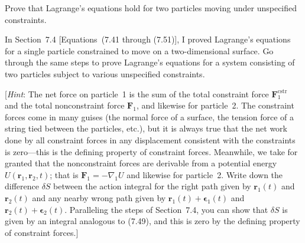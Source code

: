 \documentclass[11pt,letterpaper,boxed]{../hmcpset}
\renewcommand{\vec}[1]{\mathbf{#1}}
\begin{document}
\begin{problem}[ii]
Prove that Lagrange's equations hold for two particles moving under unspecified constraints. 

\begin{problem}[7.13]
In Section~7.4 [Equations~(7.41 through (7.51)], I proved Lagrange's equations for a single particle constrained to move on a two-dimensional surface. 
Go through the same steps to prove Lagrange's equations for a system consisting of two particles subject to various unspecified constraints. 

\bigskip

[\textit{Hint}: The net force on particle~1 is the sum of the total constraint force $\vec{F}_1^\text{cstr}$ and the total nonconstraint force $\vec{F}_1$, and likewise for particle~2. 
The constraint forces come in many guises (the normal force of a surface, the tension force of a string tied between the particles, etc.), but it is always true that the net work done by all constraint forces in any displacement consistent with the constraints is zero---this is the defining property of constraint forces. 
Meanwhile, we take for granted that the nonconstraint forces are derivable from a potential energy $U(\vec{r}_1, \vec{r}_2, t)$; that is $\vec{F}_1 = - \nabla_1 U$ and likewise for particle~2. 
Write down the difference $\delta S$  between the action integral for the right path given by $\vec{r}_1(t)$ and $\vec{r}_2(t)$ and any nearby wrong path given by $\vec{r}_1(t) + \boldsymbol{\epsilon}_1(t)$ and $\vec{r}_2(t) + \boldsymbol{\epsilon}_2(t)$. 
Paralleling the steps of Section~7.4, you can show that $\delta S$ is given by an integral analogous to (7.49), and this is zero by the defining property of constraint forces.]
\end{problem}
\end{problem}

\begin{solution}

\vfill
\end{solution}

\newpage 
\end{document}
